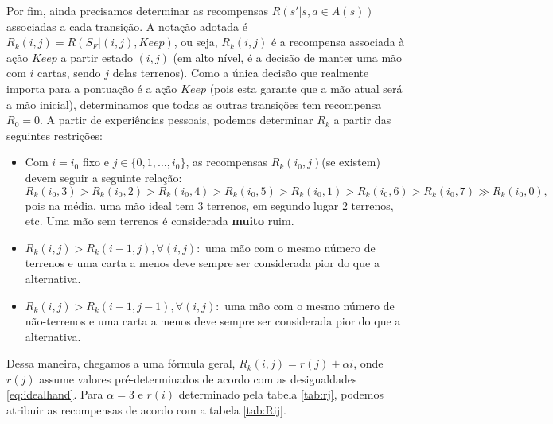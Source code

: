 \documentclass[dvipsnames]{book}
\begin{document}
Por fim, ainda precisamos determinar as recompensas $R\left(s' | s, a \in A(s) \right)$ associadas a cada
transição. A notação adotada é $R_k(i, j) = R(S_F | (i, j), Keep)$, ou seja, $R_k(i, j)$ é a recompensa
associada à ação $Keep$ a partir estado $(i, j)$ (em alto nível, é a decisão de manter uma mão com $i$
cartas, sendo $j$ delas terrenos). Como a única decisão que realmente importa para a pontuação é a ação
$Keep$ (pois esta garante que a mão atual será a mão inicial), determinamos que todas as outras transições
tem recompensa $R_0 = 0$. A partir de experiências pessoais, podemos determinar $R_k$ a partir das seguintes
restrições:
\begin{itemize}
  \item Com $i= i_0$ fixo e $j\in\{0,1,\ldots,i_0\}$, as recompensas $R_k(i_0, j)$(se existem) devem seguir a
  seguinte relação:
  \begin{equation} \label{eq:idealhand}R_k (i_0, 3) > R_k(i_0, 2) > R_k(i_0, 4)
> R_k(i_0, 5) > R_k(i_0, 1) > R_k(i_0, 6) > R_k(i_0, 7) \gg R_k(i_0,
0),\end{equation}
  pois na média, uma mão ideal tem 3 terrenos, em segundo lugar 2
terrenos, etc. Uma mão sem terrenos é considerada \textbf{muito} ruim.
  \item $R_k(i, j) > R_k(i - 1, j), \forall (i, j):$ uma mão com o mesmo
número de terrenos e uma carta a menos deve sempre ser considerada pior
do que a alternativa.
  \item $R_k(i, j) > R_k(i - 1, j - 1), \forall (i, j):$ uma mão com o mesmo
número de não-terrenos e uma carta a menos deve sempre ser considerada
pior do que a alternativa.
\end{itemize}



Dessa maneira, chegamos a uma fórmula geral, $R_k(i, j) = r(j) + \alpha
i$, onde $r(j)$ assume valores pré-determinados de acordo com
as desigualdades \ref{eq:idealhand}. Para $\alpha = 3$ e $r(i)$ determinado pela tabela
\ref{tab:rj}, podemos atribuir as recompensas de acordo com a tabela
\ref{tab:Rij}.
\end{document}
